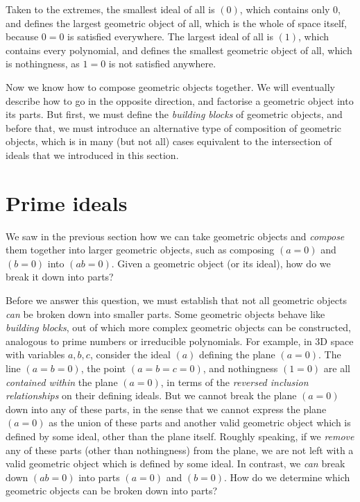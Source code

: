 \documentclass[12pt]{article}
\begin{document}
Taken to the extremes, the smallest ideal of all is $(0)$, which contains only $0$, and defines the largest geometric object of all, which is the whole of space itself, because $0=0$ is satisfied everywhere. The largest ideal of all is $(1)$, which contains every polynomial, and defines the smallest geometric object of all, which is nothingness, as $1=0$ is not satisfied anywhere.

Now we know how to compose geometric objects together. We will eventually describe how to go in the opposite direction, and factorise a geometric object into its parts. But first, we must define the \emph{building blocks} of geometric objects, and before that, we must introduce an alternative type of composition of geometric objects, which is in many (but not all) cases equivalent to the intersection of ideals that we introduced in this section.

\newpage
\section{Prime ideals}\label{Prime ideals}

We saw in the previous section how we can take geometric objects and \emph{compose} them together into larger geometric objects, such as composing $(a=0)$ and $(b=0)$ into $(ab=0)$. Given a geometric object (or its ideal), how do we break it down into parts?

Before we answer this question, we must establish that not all geometric objects \emph{can} be broken down into smaller parts. Some geometric objects behave like \emph{building blocks}, out of which more complex geometric objects can be constructed, analogous to prime numbers or irreducible polynomials. For example, in 3D space with variables $a,b,c$, consider the ideal $(a)$ defining the plane $(a=0)$. The line $(a=b=0)$, the point $(a=b=c=0)$, and nothingness $(1=0)$ are all \emph{contained within} the plane $(a=0)$, in terms of the \emph{reversed inclusion relationships} on their defining ideals. But we cannot break the plane $(a=0)$ down into any of these parts, in the sense that we cannot express the plane $(a=0)$ as the union of these parts and another valid geometric object which is defined by some ideal, other than the plane itself. Roughly speaking, if we \emph{remove} any of these parts (other than nothingness) from the plane, we are not left with a valid geometric object which is defined by some ideal. In contrast, we \emph{can} break down $(ab=0)$ into parts $(a=0)$ and $(b=0)$. How do we determine which geometric objects can be broken down into parts?
\end{document}
